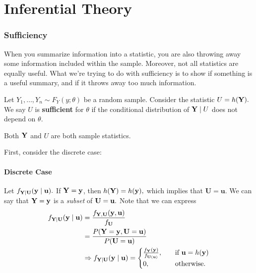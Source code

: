 \chapter{Inferential Theory}

\subsection{Sufficiency}
When you summarize information into a statistic, you are also throwing away some information included within the sample. Moreover, not all statistics are equally useful. What we're trying to do with sufficiency is to show if something is a useful summary, and if it throws away too much information.

\begin{definition}
Let $Y_1,\ldots, Y_n\sim F_Y(y;\theta)$ be a random sample. Consider the statistic $U=h(\mathbf Y).$ We say $U$ is \textbf{sufficient} for $\theta$ if the conditional distribution of $\mathbf Y \mid U$ does not depend on $\theta.$
\end{definition}
\begin{note}
Both $\mathbf Y$ and $U$ are both sample statistics. 
\end{note}

First, consider the discrete case:

\subsubsection{Discrete Case}

Let $f_{\mathbf Y\mid \mathbf U}(\mathbf y\mid \mathbf u).$ If $\mathbf Y=\mathbf y$, then $h(\mathbf Y)=h(\mathbf y),$ which implies that $\mathbf U=\mathbf u.$ We can say that $\mathbf Y=\mathbf y$ is a \textit{subset} of $\mathbf U=\mathbf u.$ Note that we can express
\begin{align*}
f_{\mathbf Y\mid \mathbf U}(\mathbf y\mid \mathbf u) &= \frac{f_{\mathbf Y,\mathbf U}(\mathbf y,\mathbf u)}{f_{\mathbf U}} \\
&=\frac{P(\mathbf Y=\mathbf y,\mathbf U=\mathbf u)}{P(\mathbf U=\mathbf u)}\\
&\Rightarrow f_{\mathbf Y\mid \mathbf U}(\mathbf y\mid \mathbf u)=\begin{cases}
\frac{f_{\mathbf Y}(\mathbf y)}{f_{\mathbf U(\mathbf u)}},\quad &\text{if } \mathbf u=h(\mathbf y) \\
0, \quad &\text{otherwise.}
\end{cases}
\end{align*}

